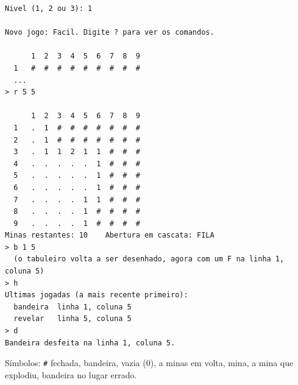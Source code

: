 \documentclass[11pt]{article}
\begin{document}
\begin{lstlisting}[style=terminal]
Nivel (1, 2 ou 3): 1

Novo jogo: Facil. Digite ? para ver os comandos.

      1  2  3  4  5  6  7  8  9
  1   #  #  #  #  #  #  #  #  #
  ...
> r 5 5

      1  2  3  4  5  6  7  8  9
  1   .  1  #  #  #  #  #  #  #
  2   .  1  #  #  #  #  #  #  #
  3   .  1  1  2  1  1  #  #  #
  4   .  .  .  .  .  1  #  #  #
  5   .  .  .  .  .  1  #  #  #
  6   .  .  .  .  .  1  #  #  #
  7   .  .  .  .  1  1  #  #  #
  8   .  .  .  .  1  #  #  #  #
  9   .  .  .  .  1  #  #  #  #
Minas restantes: 10    Abertura em cascata: FILA
> b 1 5
  (o tabuleiro volta a ser desenhado, agora com um F na linha 1, coluna 5)
> h
Ultimas jogadas (a mais recente primeiro):
  bandeira  linha 1, coluna 5
  revelar   linha 5, coluna 5
> d
Bandeira desfeita na linha 1, coluna 5.
\end{lstlisting}

Símbolos: \lstinline[style=inline]|#| fechada,  bandeira,  vazia (0),  a 
minas em volta, \codigo{*} mina,  a mina que explodiu, \codigo{!} bandeira no lugar errado.
\end{document}
